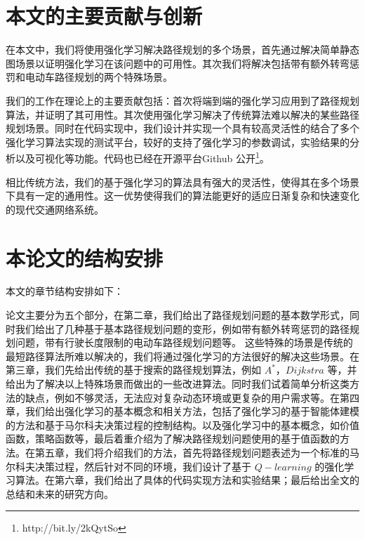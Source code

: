\documentclass{standalone}
\begin{document}


\section{本文的主要贡献与创新} 
在本文中，我们将使用强化学习解决路径规划的多个场景，首先通过解决简单静态图场景以证明强化学习在该问题中的可用性。其次我们将解决包括带有额外转弯惩罚和电动车路径规划的两个特殊场景。\par
我们的工作在理论上的主要贡献包括：首次将端到端的强化学习应用到了路径规划算法，并证明了其可用性。其次使用强化学习解决了传统算法难以解决的某些路径规划场景。同时在代码实现中，我们设计并实现一个具有较高灵活性的结合了多个强化学习算法实现的测试平台，较好的支持了强化学习的参数调试，实验结果的分析以及可视化等功能。代码也已经在开源平台Github 公开\footnote{http://bit.ly/2kQytSo}。\par
相比传统方法，我们的基于强化学习的算法具有强大的灵活性，使得其在多个场景下具有一定的通用性。这一优势使得我们的算法能更好的适应日渐复杂和快速变化的现代交通网络系统。
\section{本论文的结构安排}
本文的章节结构安排如下：\par
论文主要分为五个部分，在第二章，我们给出了路径规划问题的基本数学形式，同时我们给出了几种基于基本路径规划问题的变形，例如带有额外转弯惩罚的路径规划问题，带有行驶长度限制的电动车路径规划问题等。
这些特殊的场景是传统的最短路径算法所难以解决的，我们将通过强化学习的方法很好的解决这些场景。在第三章，我们先给出传统的基于搜索的路径规划算法，例如 $A^{*}$，$Dijkstra$ 等，并给出为了解决以上特殊场景而做出的一些改进算法。同时我们试着简单分析这类方法的缺点，例如不够灵活，无法应对复杂动态环境或更复杂的用户需求等。在第四章，我们给出强化学习的基本概念和相关方法，包括了强化学习的基于智能体建模的方法和基于马尔科夫决策过程的控制结构。以及强化学习中的基本概念，如价值函数，策略函数等，最后着重介绍为了解决路径规划问题使用的基于值函数的方法。在第五章，我们将介绍我们的方法，首先将路径规划问题表述为一个标准的马尔科夫决策过程，然后针对不同的环境，我们设计了基于 $Q-learning$ 的强化学习算法。在第六章，我们给出了具体的代码实现方法和实验结果；最后给出全文的总结和未来的研究方向。
\end{document}
